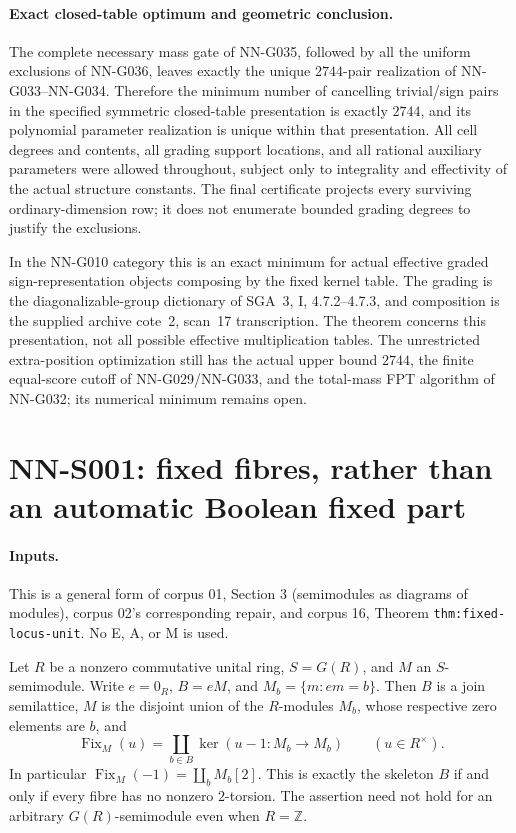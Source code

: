 \paragraph{Exact closed-table optimum and geometric conclusion.}
The complete necessary mass gate of NN-G035,
followed by all the uniform exclusions of NN-G036,
leaves exactly the unique $2744$-pair realization
of NN-G033--NN-G034. Therefore the minimum number
of cancelling trivial/sign pairs in the specified
symmetric closed-table presentation is exactly
$2744$, and its polynomial parameter realization
is unique within that presentation.
All cell degrees and contents, all grading support
locations, and all rational auxiliary parameters
were allowed throughout, subject only to integrality
and effectivity of the actual structure constants.
The final certificate projects every surviving
ordinary-dimension row; it does not enumerate
bounded grading degrees to justify the exclusions.

In the NN-G010 category this is an exact minimum
for actual effective graded sign-representation
objects composing by the fixed kernel table.
The grading is the diagonalizable-group dictionary
of SGA~3, I, 4.7.2--4.7.3, and composition is
the supplied archive cote~2, scan~17 transcription.
The theorem concerns this presentation, not all
possible effective multiplication tables.
The unrestricted extra-position optimization still
has the actual upper bound $2744$, the finite
equal-score cutoff of NN-G029/NN-G033, and the
total-mass FPT algorithm of NN-G032; its numerical
minimum remains open.




\section{NN-S001: fixed fibres, rather than an automatic Boolean fixed part}
\label{sec:NN-S001}

\paragraph{Inputs.} This is a general form of corpus 01, Section 3
(semimodules as diagrams of modules), corpus 02's corresponding repair,
and corpus 16, Theorem \texttt{thm:fixed-locus-unit}. No E, A, or M is used.

\begin{theorem}[NN-S001]
Let $R$ be a nonzero commutative unital ring, $S=G(R)$, and $M$ an
$S$-semimodule. Write $e=0_R$, $B=eM$, and $M_b=\{m:em=b\}$.
Then $B$ is a join semilattice, $M$ is the disjoint union of the
$R$-modules $M_b$, whose respective zero elements are $b$, and
\[
 \operatorname{Fix}_M(u)=\coprod_{b\in B}\ker(u-1:M_b\longrightarrow M_b)
 \qquad(u\in R^\times).
\]
In particular $\operatorname{Fix}_M(-1)=\coprod_b M_b[2]$.
This is exactly the skeleton $B$ if and only if every fibre has no
nonzero $2$-torsion. The assertion need not hold for an arbitrary
$G(R)$-semimodule even when $R=\mathbb Z$.
\end{theorem}

